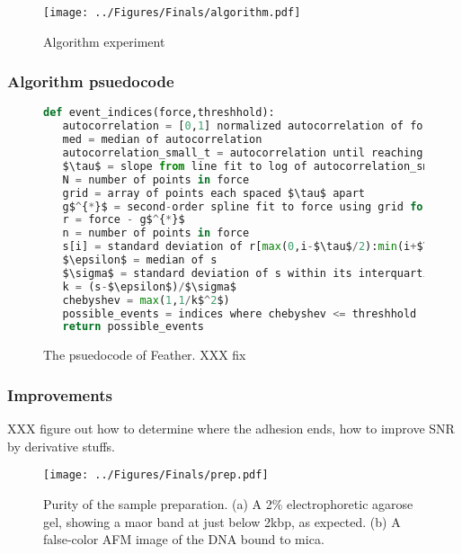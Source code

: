 \documentclass[%
  aip,12pt,tightenlines,
  amsthm,
 amsmath,amssymb
]{article}
\newcommand{\fLabel}[1]{\label{figure:#1}}
\newcommand{\pEndF}[0]{ \\ }
\newcommand{\pStartF}[0]{ }
\newcommand{\name}[0]{Feather}
\newcommand{\figwidth}[0]{\linewidth}
\begin{document}
\begin{figure}
\centering
\texttt{[image: ../Figures/Finals/algorithm.pdf]}%
\caption[\name{} algorithmic pipeline]{\noindent\fLabel{FeatherExample}\pStartF Algorithm experiment \pEndF }
\end{figure}


\subsubsection{Algorithm psuedocode}

\begin{figure}
  \begin{lstlisting}[language=Python]
def event_indices(force,threshhold):
   autocorrelation = [0,1] normalized autocorrelation of force
   med = median of autocorrelation
   autocorrelation_small_t = autocorrelation until reaching med
   $\tau$ = slope from line fit to log of autocorrelation_small_t
   N = number of points in force
   grid = array of points each spaced $\tau$ apart
   g$^{*}$ = second-order spline fit to force using grid for knots
   r = force - g$^{*}$
   n = number of points in force
   s[i] = standard deviation of r[max(0,i-$\tau$/2):min(i+$\tau$/2,n)]
   $\epsilon$ = median of s
   $\sigma$ = standard deviation of s within its interquartile region
   k = (s-$\epsilon$)/$\sigma$
   chebyshev = max(1,1/k$^2$)
   possible_events = indices where chebyshev <= threshhold
   return possible_events
\end{lstlisting}
\caption[\name{} psuedocode]{\noindent\fLabel{Code}\pStartF The psuedocode of \name{}. XXX fix\pEndF }
\end{figure}


\subsubsection{Improvements}

XXX figure out how to determine where the adhesion ends, how to improve SNR by derivative stuffs.


\begin{figure}
\centering
\texttt{[image: ../Figures/Finals/prep.pdf]}%
\caption[Verification of sample purity]{\noindent\fLabel{Prep}\pStartF Purity of the sample preparation. (a) A 2\% electrophoretic agarose gel, showing a maor band at just below 2kbp, as expected. (b) A false-color AFM image of the DNA bound to mica. \pEndF }
\end{figure}
\end{document}
